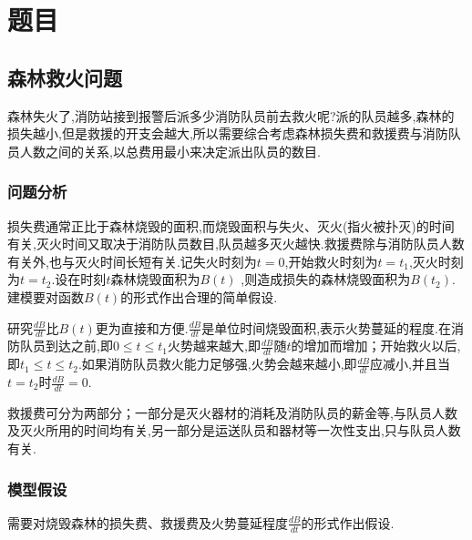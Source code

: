 \documentclass[UTF8]{article}
\begin{document}
    \tableofcontents
    \newpage


    \section{题目}
    
    \subsection{森林救火问题}

        森林失火了,消防站接到报警后派多少消防队员前去救火呢?派的队员越多,森林的损失越小,但是救援的开支会越大,所以需要综合考虑森林损失费和救援费与消防队员人数之间的关系,以总费用最小来决定派出队员的数目.

    \subsubsection{问题分析}
        
        损失费通常正比于森林烧毁的面积,而烧毁面积与失火、灭火(指火被扑灭)的时间有关,灭火时间又取决于消防队员数目,队员越多灭火越快.救援费除与消防队员人数有关外,也与灭火时间长短有关.记失火时刻为$t=0$,开始救火时刻为$t=t_1$,灭火时刻为$t=t_2$.设在时刻$t$森林烧毁面积为$B(t)$ ,则造成损失的森林烧毁面积为$B(t_2)$.建模要对函数$B(t)$的形式作出合理的简单假设.
    
        研究$\frac{dB}{dt}$比$B(t)$更为直接和方便.$\frac{dB}{dt}$是单位时间烧毁面积,表示火势蔓延的程度.在消防队员到达之前,即$0 \leqslant t \leqslant t_1$火势越来越大,即$\frac{dB}{dt}$随$t$的增加而增加；开始救火以后,即$t_1 \leqslant t \leqslant t_2$.如果消防队员救火能力足够强,火势会越来越小,即$\frac{dB}{dt}$应减小,并且当$t=t_2$时$\frac{dB}{dt}=0$.

        救援费可分为两部分；一部分是灭火器材的消耗及消防队员的薪金等,与队员人数及灭火所用的时间均有关,另一部分是运送队员和器材等一次性支出,只与队员人数有关.
    
    \subsubsection{模型假设}
        
        需要对烧毁森林的损失费、救援费及火势蔓延程度$\frac{dB}{dt}$的形式作出假设.
\end{document}
